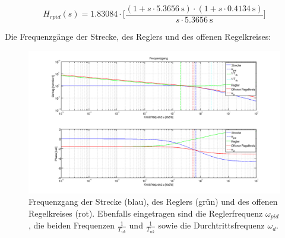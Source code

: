 \begin{equation} \label{eq:pid:target}
    H_{rpid}(s) = 1.83084 \cdot \biggl[ \frac{(1 + s \cdot \SI{5.3656}{\second} ) \cdot (1 + s \cdot \SI{0.4134}{\second} ) }{ s \cdot \SI{5.3656}{\second} } \biggr]
\end{equation}

Die Frequenzg\"ange der Strecke, des Reglers und des offenen Regelkreises:

\begin{figure}[h! width=\pagewidth]
    \includegraphics[width=.9\textwidth]{images/pidCompletePlot.png}
    \caption{%
        Frequenzgang der Strecke (blau), des  Reglers (gr\"un) und des offenen
        Regelkreises  (rot).  Ebenfalls  eingetragen  sind die  Reglerfrequenz
        $\omega_{pid}$,   die   beiden   Frequenzen   $\frac{1}{T_{vk}}$   und
        $\frac{1}{T_{nk}}$ sowie die Durchtrittsfrequenz $\omega_d$.
    }
    \label{fig:plant_step}
\end{figure}
